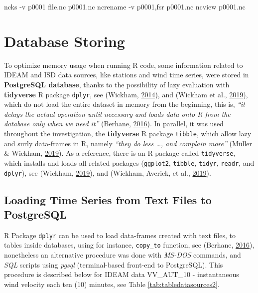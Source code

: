 \documentclass[12pt,twoside]{reedthesis}
\newenvironment{Shaded}{\begin{snugshade}}{\end{snugshade}}
\newcommand{\ExtensionTok}[1]{#1}
\newcommand{\NormalTok}[1]{#1}
\begin{document}
\scriptsize

\vspace{0.4cm}
\begin{Shaded}
\begin{Highlighting}[]
      \ExtensionTok{ncks}\NormalTok{ -v p0001 file.nc p0001.nc}
      \ExtensionTok{ncrename}\NormalTok{ -v p0001,fsr p0001.nc}
      \ExtensionTok{ncview}\NormalTok{ p0001.nc}
\end{Highlighting}
\end{Shaded}
\normalsize

\hypertarget{dbstoring}{%
\chapter{Database Storing}\label{dbstoring}}

To optimize memory usage when running R code, some information related to IDEAM and ISD data sources, like stations and wind time series, were stored in \textbf{PostgreSQL database}, thanks to the possibility of lazy evaluation with \textbf{tidyverse} R package \texttt{dplyr}, see (Wickham, \protect\hyperlink{ref-Wickham2014}{2014}), and (Wickham et al., \protect\hyperlink{ref-Wickham2019}{2019}), which do not load the entire dataset in memory from the beginning, this is, \emph{``it delays the actual operation until necessary and loads data onto R from the database only when we need it''} (Berhane, \protect\hyperlink{ref-databasesinr}{2016}). In parallel, it was used throughout the investigation, the \textbf{tidyverse} R package \texttt{tibble}, which allow lazy and surly data-frames in R, namely \emph{``they do less \ldots, and complain more''} (Müller \& Wickham, \protect\hyperlink{ref-Mueller2019}{2019}). As a reference, there is an R package called \texttt{tidyverse}, which installs and loads all related packages (\texttt{ggplot2}, \texttt{tibble}, \texttt{tidyr}, \texttt{readr}, and \texttt{dplyr}), see (Wickham, \protect\hyperlink{ref-Wickham2019a}{2019}), and (Wickham, Averick, et al., \protect\hyperlink{ref-Wickham2019b}{2019}).

\hypertarget{loading-time-series-from-text-files-to-postgresql}{%
\section{Loading Time Series from Text Files to PostgreSQL}\label{loading-time-series-from-text-files-to-postgresql}}

R Package \texttt{dplyr} can be used to load data-frames created with text files, to tables inside databases, using for instance, \texttt{copy\_to} function, see (Berhane, \protect\hyperlink{ref-databasesinr}{2016}), nonetheless an alternative procedure was done with \emph{MS-DOS} commands, and \emph{SQL} scripts using \emph{pgsql} (terminal-based front-end to PostgreSQL). This procedure is described below for IDEAM data VV\_AUT\_10 - instantaneous wind velocity each ten (10) minutes, see Table \ref{tab:tabledatasources2}.
\end{document}
